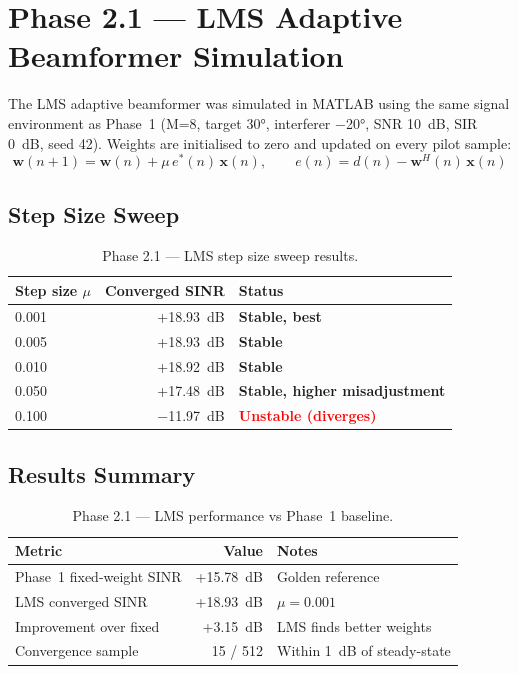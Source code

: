 \documentclass[11pt,a4paper]{article}
\begin{document}
\section{Phase 2.1 --- LMS Adaptive Beamformer Simulation}

The LMS adaptive beamformer was simulated in MATLAB using the same signal
environment as Phase~1 (M=8, target 30°, interferer −20°, SNR 10~dB,
SIR 0~dB, seed 42). Weights are initialised to zero and updated on every
pilot sample:
\[
    \mathbf{w}(n+1) = \mathbf{w}(n) + \mu\, e^*(n)\, \mathbf{x}(n),
    \qquad e(n) = d(n) - \mathbf{w}^H(n)\,\mathbf{x}(n)
\]

\subsection{Step Size Sweep}

\begin{table}[H]
\centering
\begin{tabular}{lrl}
\toprule
\textbf{Step size $\mu$} & \textbf{Converged SINR} & \textbf{Status} \\
\midrule
0.001 & +18.93~dB & \textcolor{passgreen}{\textbf{Stable, best}} \\
0.005 & +18.93~dB & \textcolor{passgreen}{\textbf{Stable}} \\
0.010 & +18.92~dB & \textcolor{passgreen}{\textbf{Stable}} \\
0.050 & +17.48~dB & \textcolor{passgreen}{\textbf{Stable, higher misadjustment}} \\
0.100 & −11.97~dB & \textcolor{red}{\textbf{Unstable (diverges)}} \\
\bottomrule
\end{tabular}
\caption{Phase 2.1 --- LMS step size sweep results.}
\end{table}

\subsection{Results Summary}

\begin{table}[H]
\centering
\begin{tabular}{lrl}
\toprule
\textbf{Metric} & \textbf{Value} & \textbf{Notes} \\
\midrule
Phase~1 fixed-weight SINR   & +15.78~dB & Golden reference \\
LMS converged SINR          & +18.93~dB & $\mu = 0.001$ \\
Improvement over fixed      & +3.15~dB  & LMS finds better weights \\
Convergence sample          & 15 / 512  & Within 1~dB of steady-state \\
\bottomrule
\end{tabular}
\caption{Phase 2.1 --- LMS performance vs Phase~1 baseline.}
\end{table}
\end{document}
